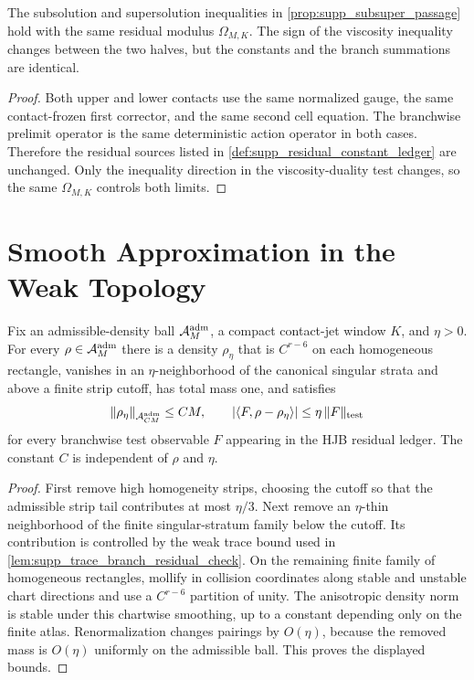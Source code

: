 \begin{proposition}
\label{prop:supp_uniform_subsuper_modulus}
The subsolution and supersolution inequalities in
\cref{prop:supp_subsuper_passage} hold with the same residual modulus
\(\Omega_{M,K}\).  The sign of the viscosity inequality changes between the
two halves, but the constants and the branch summations are identical.
\end{proposition}

\begin{proof}
Both upper and lower contacts use the same normalized gauge, the same
contact-frozen first corrector, and the same second cell equation.  The
branchwise prelimit operator is the same deterministic action operator in both
cases.  Therefore the residual sources listed in
\cref{def:supp_residual_constant_ledger} are unchanged.  Only the inequality
direction in the viscosity-duality test changes, so the same
\(\Omega_{M,K}\) controls both limits.
\end{proof}

\section{Smooth Approximation in the Weak Topology}

\begin{lemma}
\label{lem:supp_admissible_density_smoothing}
Fix an admissible-density ball \(\mathcal A^{\mathrm{adm}}_M\), a compact contact-jet window \(K\),
and \(\eta>0\).  For every \(\rho\in\mathcal A^{\mathrm{adm}}_M\) there is a density
\(\rho_{\eta}\) that is \(C^{r-6}\) on each homogeneous rectangle, vanishes in
an \(\eta\)-neighborhood of the canonical singular strata and above a finite
strip cutoff, has total mass one, and satisfies
\[
  \|\rho_\eta\|_{\mathcal A^{\mathrm{adm}}_{C M}}\le C M,\qquad
  |\langle F,\rho-\rho_\eta\rangle|
  \le \eta\,\|F\|_{\rm test}
\]
for every branchwise test observable \(F\) appearing in the HJB residual
ledger.  The constant \(C\) is independent of \(\rho\) and \(\eta\).
\end{lemma}

\begin{proof}
First remove high homogeneity strips, choosing the cutoff so that the
admissible strip tail contributes at most \(\eta/3\).  Next remove an
\(\eta\)-thin neighborhood of the finite singular-stratum family below the
cutoff.  Its contribution is controlled by the weak trace bound used in
\cref{lem:supp_trace_branch_residual_check}.  On the remaining finite family
of homogeneous rectangles, mollify in collision coordinates along stable and
unstable chart directions and use a \(C^{r-6}\) partition of unity.  The
anisotropic density norm is stable under this chartwise smoothing, up to a
constant depending only on the finite atlas.  Renormalization changes pairings
by \(O(\eta)\), because the removed mass is \(O(\eta)\) uniformly on the
admissible ball.  This proves the displayed bounds.
\end{proof}

